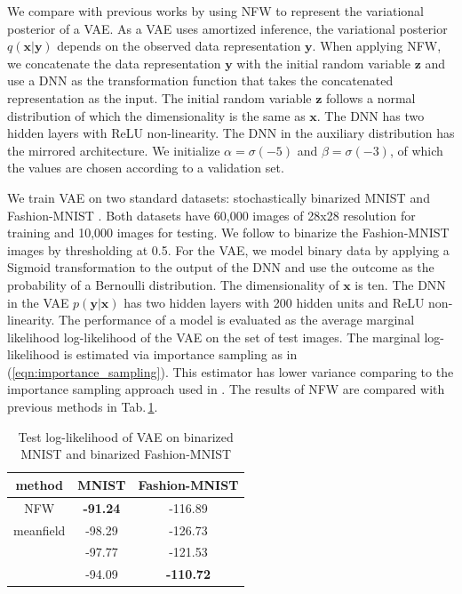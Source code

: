 \documentclass[twoside]{article}
\newcommand{\yV}{\mathbf{y}}
\newcommand{\xV}{\mathbf{x}}
\newcommand{\zV}{\mathbf{z}}
\newcommand{\acr}[1]{\textsc{#1}\xspace}
\newcommand{\us}{\acr{NFW}}
\begin{document}
We compare with previous works by using \us to represent the variational posterior of a VAE. As a VAE uses amortized inference, the variational posterior $q(\xV|\yV)$ depends on the observed data representation $\yV$. When applying \us, we concatenate the data representation $\yV$ with the initial random variable $\zV$ and use a DNN as the transformation function that takes the concatenated representation as the input. The initial random variable $\zV$ follows a normal distribution of which the dimensionality is the same as $\xV$. The DNN has two hidden layers with ReLU non-linearity. The DNN in the auxiliary distribution has the mirrored architecture. We initialize $\alpha=\sigma(-5)$ and $\beta=\sigma(-3)$, of which the values are chosen according to a validation set.

We train VAE on two standard datasets: stochastically binarized MNIST \citep{SalakhutdinovMurray2008} and Fashion-MNIST \citep{XiaoEtAl2017}. Both datasets have 60,000 images of 28x28 resolution for training and 10,000 images for testing. We follow \citep{TitsiasRuiz2019} to binarize the Fashion-MNIST images by thresholding at 0.5. For the VAE, we model binary data by applying a Sigmoid transformation to the output of the DNN and use the outcome as the probability of a Bernoulli distribution. The dimensionality of $\xV$ is ten. The DNN in the VAE $p(\yV|\xV)$ has two hidden layers with 200 hidden units and ReLU non-linearity. The performance of a model is evaluated as the average marginal likelihood log-likelihood of the VAE on the set of test images. The marginal log-likelihood is estimated via importance sampling as in (\ref{eqn:importance_sampling}). This estimator has lower variance comparing to the importance sampling approach used in \citep{YinZhou2018, TitsiasRuiz2019}.
%
The results of \us are compared with previous methods in Tab.\,\ref{tab:vae}.

\begin{table}[t]
\centering
 \begin{tabular}{c c c} 
 \hline
 method & MNIST & Fashion-MNIST  \\ [0.5ex] 
 \hline\hline
 \us & \textbf{-91.24} & -116.89 \\
 meanfield & -98.29 & -126.73  \\ 
 \citep{YinZhou2018} & -97.77 & -121.53 \\
 \citep{TitsiasRuiz2019} & -94.09 & \textbf{-110.72}  \\ 
 \hline
\end{tabular}
\caption{Test log-likelihood of VAE on binarized MNIST and binarized Fashion-MNIST} \label{tab:vae}
\vspace{-5mm}
\end{table}
\end{document}
